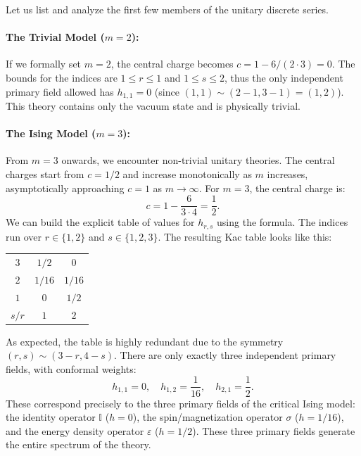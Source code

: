 Let us list and analyze the first few members of the unitary discrete series.

\paragraph{The Trivial Model (\(m=2\)):}
If we formally set \(m=2\), the central charge becomes \(c = 1 - 6/(2 \cdot 3) = 0\). The bounds for the indices are \(1 \le r \le 1\) and \(1 \le s \le 2\), thus the only independent primary field allowed has \(h_{1,1} = 0\) (since \((1,1) \sim (2-1, 3-1) = (1,2)\)). This theory contains only the vacuum state and is physically trivial.

\paragraph{The Ising Model (\(m=3\)):}
From \(m=3\) onwards, we encounter non-trivial unitary theories. The central charges start from \(c=1/2\) and increase monotonically as \(m\) increases, asymptotically approaching \(c=1\) as \(m \to \infty\).
For \(m=3\), the central charge is:
\[
    c = 1 - \frac{6}{3 \cdot 4} = \frac{1}{2}.
\]
We can build the explicit table of values for \(h_{r,s}\) using the formula. The indices run over \(r \in \{1, 2\}\) and \(s \in \{1, 2, 3\}\). The resulting Kac table looks like this:
\begin{table}[H]
    \centering
    \begin{tabular}{c|cc}
        \toprule
        \(3\)   & \(1/2\)  & \(0\)    \\
        \(2\)   & \(1/16\) & \(1/16\) \\
        \(1\)   & \(0\)    & \(1/2\)  \\
        \midrule
        \(s/r\) & \(1\)    & \(2\)    \\
        \bottomrule
    \end{tabular}
\end{table}
As expected, the table is highly redundant due to the symmetry \((r,s) \sim (3-r, 4-s)\). There are only exactly three independent primary fields, with conformal weights:
\[
    h_{1,1} = 0, \quad h_{1,2} = \frac{1}{16}, \quad h_{2,1} = \frac{1}{2}.
\]
These correspond precisely to the three primary fields of the critical Ising model: the identity operator \(\mathbb{I}\) (\(h=0\)), the spin/magnetization operator \(\sigma\) (\(h=1/16\)), and the energy density operator \(\varepsilon\) (\(h=1/2\)). These three primary fields generate the entire spectrum of the theory.

